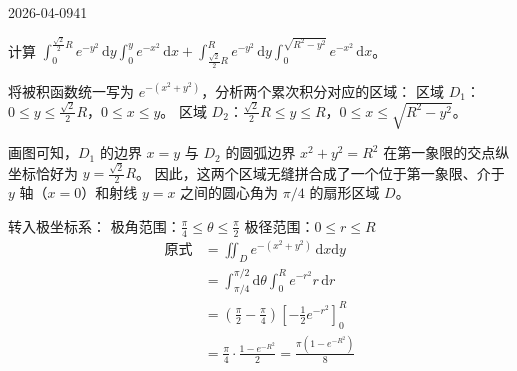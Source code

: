 \begin{mistake}{2026-04-09}{41}

\begin{problemcontent}
计算 \( \displaystyle\int_0^{\frac{\sqrt{2}}{2}R} e^{-y^2}\,\mathrm{d}y \int_0^y e^{-x^2}\,\mathrm{d}x + \int_{\frac{\sqrt{2}}{2}R}^{R} e^{-y^2}\,\mathrm{d}y \int_0^{\sqrt{R^2 - y^2}} e^{-x^2}\,\mathrm{d}x \)。
\end{problemcontent}

\begin{solutioncontent}
将被积函数统一写为 \( e^{-(x^2+y^2)} \)，分析两个累次积分对应的区域：
区域 \( D_1 \)：\( 0 \leqslant y \leqslant \frac{\sqrt{2}}{2}R \)，\( 0 \leqslant x \leqslant y \)。
区域 \( D_2 \)：\( \frac{\sqrt{2}}{2}R \leqslant y \leqslant R \)，\( 0 \leqslant x \leqslant \sqrt{R^2 - y^2} \)。

画图可知，\( D_1 \) 的边界 \( x=y \) 与 \( D_2 \) 的圆弧边界 \( x^2+y^2=R^2 \) 在第一象限的交点纵坐标恰好为 \( y = \frac{\sqrt{2}}{2}R \)。
因此，这两个区域无缝拼合成了一个位于第一象限、介于 \( y \) 轴（\( x=0 \)）和射线 \( y=x \) 之间的圆心角为 \( \pi/4 \) 的扇形区域 \( D \)。

转入极坐标系：
极角范围：\( \frac{\pi}{4} \leqslant \theta \leqslant \frac{\pi}{2} \)
极径范围：\( 0 \leqslant r \leqslant R \)
\[
\begin{aligned}
\text{原式} &= \iint_D e^{-(x^2+y^2)} \,\mathrm{d}x\mathrm{d}y \\
&= \int_{\pi/4}^{\pi/2} \mathrm{d}\theta \int_0^R e^{-r^2} r\,\mathrm{d}r \\
&= \left( \frac{\pi}{2} - \frac{\pi}{4} \right) \left[ -\frac{1}{2}e^{-r^2} \right]_0^R \\
&= \frac{\pi}{4} \cdot \frac{1-e^{-R^2}}{2} = \frac{\pi(1 - e^{-R^2})}{8}
\end{aligned}
\]
\end{solutioncontent}


\end{mistake}
